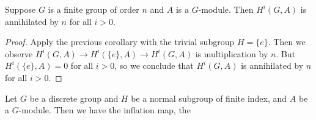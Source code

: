 \begin{corollary}
    Suppose $G$ is a finite group of order $n$
    and $A$ is a $G$-module.
    Then $H^i(G, A)$ is annihilated by $n$ for all $i>0$.
\end{corollary}
\begin{proof}
    Apply the previous corollary with the trivial subgroup $H = \{e\}$.
    Then we observe $H^i(G, A) \to H^i(\{e\}, A) \to H^i(G, A)$ is multiplication by $n$.
    But $H^i(\{e\}, A) = 0$ for all $i>0$, so we conclude that $H^i(G, A)$ is annihilated by $n$ for all $i>0$.
\end{proof}

Let $G$ be a discrete group and $H$ be a normal subgroup of finite index,
and $A$ be a $G$-module.
Then we have the inflation map, the